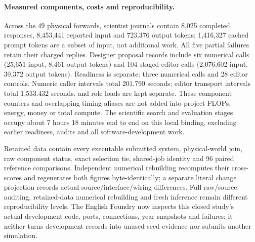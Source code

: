 \paragraph{Measured components, costs and reproducibility.}
Across the 49 physical forwards, scientist journals contain 8,025 completed
responses, 8,453,441 reported input and 723,376 output tokens; 1,416,327 cached
prompt tokens are a subset of input, not additional work. All five partial
failures retain their charged replies. Designer proposal records include six
numerical calls (25,651 input, 8,461 output tokens) and 104 staged-editor calls
(2,076,602 input, 39,372 output tokens). Readiness is separate: three numerical
calls and 28 editor controls. Numeric caller intervals total 201.790 seconds;
editor transport intervals total 1,533.432 seconds, and role loads are kept
separate. These component counters and overlapping timing aliases are not
added into project FLOPs, energy, money or total compute. The scientific search
and evaluation stages occupy about 7 hours 18 minutes end to end on this local
binding, excluding earlier readiness, audits and all software-development work.

Retained data contain every executable submitted system, physical-world join,
raw component status, exact selection tie, shared-job identity and 96 paired
reference comparisons. Independent numerical rebuilding recomputes their
cross-scores and regenerates both figures byte-identically; a separate literal
change projection records actual source/interface/wiring differences. Full
raw/source auditing, retained-data numerical rebuilding and fresh inference
remain different reproducibility levels. The English Foundry now inspects
this closed study's actual development code, ports, connections, year snapshots
and failures; it neither turns development records into unused-seed evidence
nor submits another simulation.
